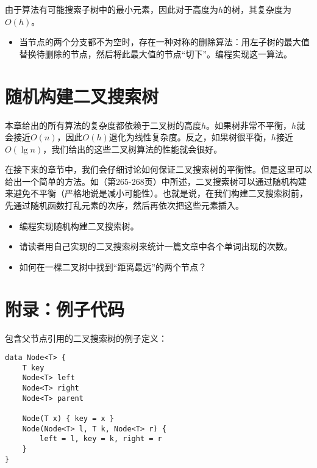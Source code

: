 \documentclass[b5paper]{ctexart}
\begin{document}
由于算法有可能搜索子树中的最小元素，因此对于高度为$h$的树，其复杂度为$O(h)$。

\begin{Exercise}

\begin{itemize}
\item 当节点的两个分支都不为空时，存在一种对称的删除算法：用左子树的最大值替换待删除的节点，然后将此最大值的节点“切下”。编程实现这一算法。
\end{itemize}

\end{Exercise}

\section{随机构建二叉搜索树}

本章给出的所有算法的复杂度都依赖于二叉树的高度$h$。如果树非常不平衡，$h$就会接近$O(n)$，因此$O(h)$退化为线性复杂度。反之，如果树很平衡，$h$接近$O(\lg n)$，我们给出的这些二叉树算法的性能就会很好。

在接下来的章节中，我们会仔细讨论如何保证二叉搜索树的平衡性。但是这里可以给出一个简单的方法。如\cite{CLRS}（第265-268页）中所述，二叉搜索树可以通过随机构建来避免不平衡（严格地说是减小可能性）。也就是说，在我们构建二叉搜索树前，先通过随机函数打乱元素的次序，然后再依次把这些元素插入。

\begin{Exercise}

\begin{itemize}
\item 编程实现随机构建二叉搜索树。
\item 请读者用自己实现的二叉搜索树来统计一篇文章中各个单词出现的次数。
\item 如何在一棵二叉树中找到“距离最远”的两个节点？
\end{itemize}

\end{Exercise}

\section{附录：例子代码}

包含父节点引用的二叉搜索树的例子定义：

\lstset{language=Bourbaki, frame=single}
\begin{lstlisting}
data Node<T> {
    T key
    Node<T> left
    Node<T> right
    Node<T> parent

    Node(T x) { key = x }
    Node(Node<T> l, T k, Node<T> r) {
        left = l, key = k, right = r
    }
}
\end{lstlisting}
\end{document}
